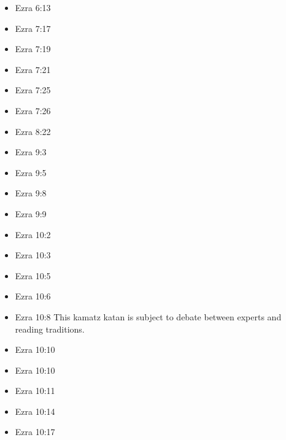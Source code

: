 \documentclass[14pt]{book}
\begin{document}
\begin{multicols}{2}
\begin{itemize}
		\item Ezra 6:13
		
		\item Ezra 7:17
		
		\item Ezra 7:19
		
		\item Ezra 7:21
		
		\item Ezra 7:25
		
		\item Ezra 7:26
		
		\item Ezra 8:22
		
		\item Ezra 9:3
		
		\item Ezra 9:5
		
		\item Ezra 9:8
		
		\item Ezra 9:9
		
		\item Ezra 10:2
		
		\item Ezra 10:3
		
		\item Ezra 10:5
		
		\item Ezra 10:6
		
		\item Ezra 10:8 This kamatz katan is subject to debate between experts and reading traditions.
		
		\item Ezra 10:10
		
		\item Ezra 10:10
		
		\item Ezra 10:11
		
		\item Ezra 10:14
		
		\item Ezra 10:17
		

\end{itemize}
\end{multicols}
\end{document}
